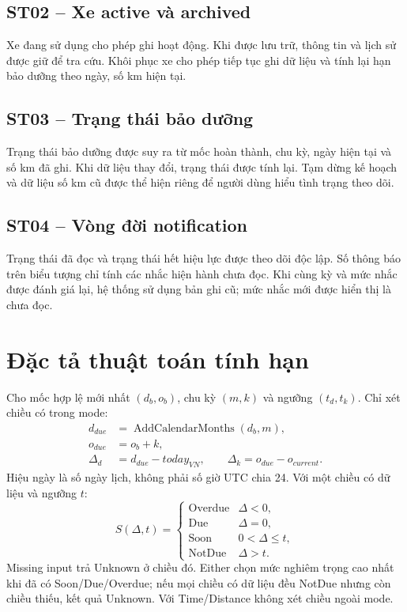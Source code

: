 \subsection{ST02 -- Xe active và archived}
Xe đang sử dụng cho phép ghi hoạt động. Khi được lưu trữ, thông tin và lịch sử được giữ để tra cứu. Khôi phục xe cho phép tiếp tục ghi dữ liệu và tính lại hạn bảo dưỡng theo ngày, số km hiện tại.

\subsection{ST03 -- Trạng thái bảo dưỡng}
Trạng thái bảo dưỡng được suy ra từ mốc hoàn thành, chu kỳ, ngày hiện tại và số km đã ghi. Khi dữ liệu thay đổi, trạng thái được tính lại. Tạm dừng kế hoạch và dữ liệu số km cũ được thể hiện riêng để người dùng hiểu tình trạng theo dõi.

\subsection{ST04 -- Vòng đời notification}
Trạng thái đã đọc và trạng thái hết hiệu lực được theo dõi độc lập. Số thông báo trên biểu tượng chỉ tính các nhắc hiện hành chưa đọc. Khi cùng kỳ và mức nhắc được đánh giá lại, hệ thống sử dụng bản ghi cũ; mức nhắc mới được hiển thị là chưa đọc.

\section{Đặc tả thuật toán tính hạn}
Cho mốc hợp lệ mới nhất $(d_b,o_b)$, chu kỳ $(m,k)$ và ngưỡng $(t_d,t_k)$. Chỉ xét chiều có trong mode:
\begin{align}
d_{due} &= \operatorname{AddCalendarMonths}(d_b,m),\\
o_{due} &= o_b + k,\\
\Delta_d &= d_{due}-today_{VN},\qquad
\Delta_k = o_{due}-o_{current}.
\end{align}
Hiệu ngày là số ngày lịch, không phải số giờ UTC chia 24. Với một chiều có dữ liệu và ngưỡng $t$:
\[
S(\Delta,t)=\begin{cases}
\text{Overdue}&\Delta<0,\\
\text{Due}&\Delta=0,\\
\text{Soon}&0<\Delta\le t,\\
\text{NotDue}&\Delta>t.
\end{cases}
\]
Missing input trả Unknown ở chiều đó. Either chọn mức nghiêm trọng cao nhất khi đã có Soon/Due/Overdue; nếu mọi chiều có dữ liệu đều NotDue nhưng còn chiều thiếu, kết quả Unknown. Với Time/Distance không xét chiều ngoài mode.

